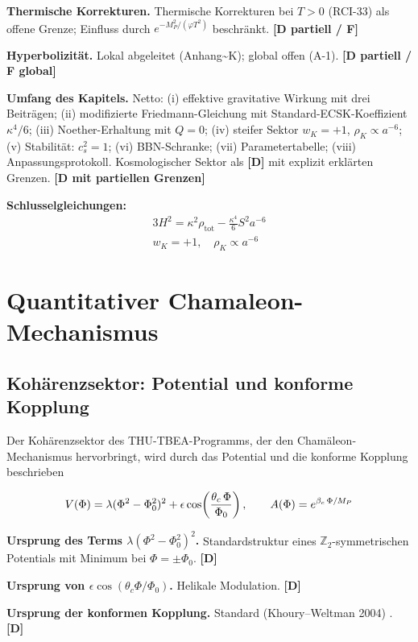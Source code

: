 ﻿\documentclass[11pt,letterpaper]{article}
\begin{document}
\textbf{Thermische Korrekturen.} Thermische Korrekturen bei $T > 0$ (RCI-33) als offene Grenze; Einfluss durch $e^{-M_P^2/(\varphi T^2)}$ beschränkt. \textbf{[D partiell / F]}

\textbf{Hyperbolizität.} Lokal abgeleitet (Anhang\textasciitilde{}K); global offen (A-1). \textbf{[D partiell / F global]}

\textbf{Umfang des Kapitels.} Netto: (i) effektive gravitative Wirkung mit drei Beiträgen; (ii) modifizierte Friedmann-Gleichung mit Standard-ECSK-Koeffizient $\kappa^4/6$; (iii) Noether-Erhaltung mit $Q = 0$; (iv) steifer Sektor $w_K = +1$, $\rho_K \propto a^{-6}$; (v) Stabilität: $c_s^2 = 1$; (vi) BBN-Schranke; (vii) Parametertabelle; (viii) Anpassungsprotokoll. Kosmologischer Sektor als \textbf{[D]} mit explizit erklärten Grenzen. \textbf{[D mit partiellen Grenzen]}

\textbf{Schlusselgleichungen:}
\begin{align*}
    3H^2 = \kappa^2\rho_{\mathrm{tot}} - \frac{\kappa^4}{6}S^2 a^{-6} \\
    w_K = +1, \quad \rho_K \propto a^{-6}
\end{align*}
\section{Quantitativer Chamaleon-Mechanismus}
\subsection{Kohärenzsektor: Potential und konforme Kopplung}
Der Kohärenzsektor des THU-TBEA-Programms, der den Chamäleon-Mechanismus hervorbringt, wird durch das Potential und die konforme Kopplung beschrieben

\begin{equation*}
  \resizebox{\ifdim\width>\linewidth \linewidth\else\width\fi}{!}{$\displaystyle V(\Phi) = \lambda(\Phi^2 - \Phi_0^2)^2 + \epsilon\cos\!\left(\frac{\theta_c\,\Phi}{\Phi_0}\right), \qquad A(\Phi) = e^{\beta_c\,\Phi/M_P}$}
\end{equation*}

\textbf{Ursprung des Terms $\lambda(\Phi^2 - \Phi_0^2)^2$.} Standardstruktur eines $\mathbb{Z}_2$-symmetrischen Potentials mit Minimum bei $\Phi = \pm\Phi_0$. \textbf{[D]}

\textbf{Ursprung von $\epsilon\cos(\theta_c\Phi/\Phi_0)$.} Helikale Modulation. \textbf{[D]}

\textbf{Ursprung der konformen Kopplung.} Standard (Khoury--Weltman 2004) \cite{KhouryWeltman2004a}. \textbf{[D]}
\end{document}
